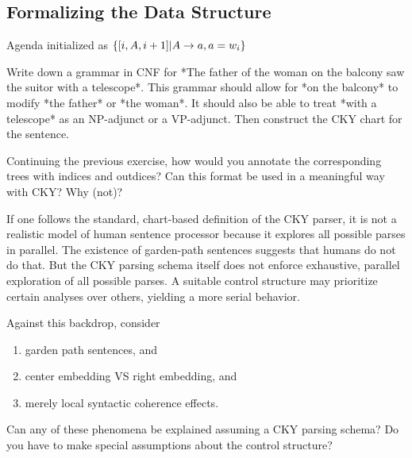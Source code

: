\subsection{Formalizing the Data Structure}
Agenda initialized as $\left \{ [i, A, i+1] | A \rightarrow a, a = w_i \right \}$

\begin{exercise}
    Write down a grammar in CNF for *The father of the woman on the balcony saw the suitor with a telescope*.
    This grammar should allow for *on the balcony* to modify *the father* or *the woman*.
    It should also be able to treat *with a telescope* as an NP-adjunct or a VP-adjunct.
    Then construct the CKY chart for the sentence.
\end{exercise}

\begin{exercise}
    Continuing the previous exercise, how would you annotate the corresponding trees with indices and outdices?
    Can this format be used in a meaningful way with CKY?
    Why (not)?
\end{exercise}

\begin{exercise}
    If one follows the standard, chart-based definition of the CKY parser, it is not a realistic model of human sentence processor because it explores all possible parses in parallel.
    The existence of garden-path sentences suggests that humans do not do that.
    But the CKY parsing schema itself does not enforce exhaustive, parallel exploration of all possible parses.
    A suitable control structure may prioritize certain analyses over others, yielding a more serial behavior.

    Against this backdrop, consider

    \begin{enumerate}
        \item garden path sentences, and
        \item center embedding VS right embedding, and
        \item merely local syntactic coherence effects.
    \end{enumerate}

    Can any of these phenomena be explained assuming a CKY parsing schema?
    Do you have to make special assumptions about the control structure?
\end{exercise}




